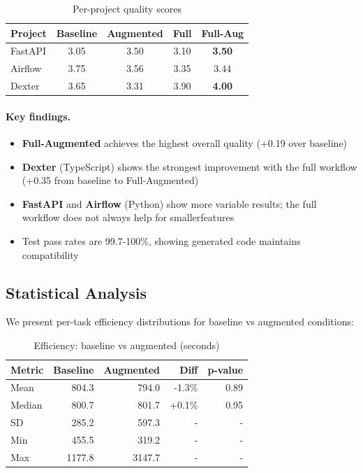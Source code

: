 \documentclass[sigconf,anonymous,review]{acmart}
\begin{document}
\begin{table}[ht]
  \centering
  \caption{Per-project quality scores}
  \label{tab:quality-projects}
  \begin{tabular}{lcccc}
    \hline
    \textbf{Project} & \textbf{Baseline} & \textbf{Augmented} & \textbf{Full} & \textbf{Full-Aug} \\
    \hline
    FastAPI & 3.05 & 3.50 & 3.10 & \textbf{3.50} \\
    Airflow & 3.75 & 3.56 & 3.35 & 3.44 \\
    Dexter & 3.65 & 3.31 & 3.90 & \textbf{4.00} \\
    \hline
  \end{tabular}
\end{table}

\paragraph{Key findings.}

\begin{itemize}
  \item \textbf{Full-Augmented} achieves the highest overall quality (+0.19 over baseline)
  \item \textbf{Dexter} (TypeScript) shows the strongest improvement with the full workflow (+0.35 from baseline to Full-Augmented)
  \item \textbf{FastAPI} and \textbf{Airflow} (Python) show more variable results; the full workflow does not always help for smaller\linebreak features
  \item Test pass rates are 99.7-100\%, showing generated code maintains compatibility
\end{itemize}

\subsection{Statistical Analysis}

We present per-task efficiency distributions for baseline vs augmented conditions:

\begin{table}[ht]
  \centering
  \caption{Efficiency: baseline vs augmented (seconds)}
  \label{tab:efficiency-distribution}
  \begin{tabular}{lrrrr}
    \hline
    \textbf{Metric} & \textbf{Baseline} & \textbf{Augmented} & \textbf{Diff} & \textbf{p-value} \\
    \hline
    Mean & 804.3 & 794.0 & -1.3\% & 0.89 \\
    Median & 800.7 & 801.7 & +0.1\% & 0.95 \\
    SD & 285.2 & 597.3 & - & - \\
    Min & 455.5 & 319.2 & - & - \\
    Max & 1177.8 & 3147.7 & - & - \\
    \hline
  \end{tabular}
\end{table}
\end{document}
